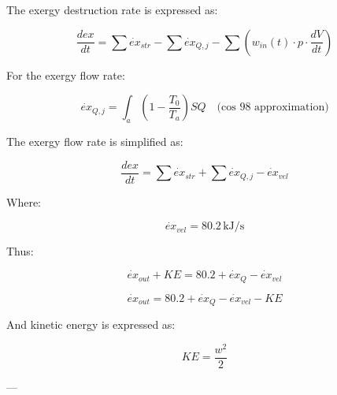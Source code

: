 The exergy destruction rate is expressed as:  

\[
\frac{d ex}{dt} = \sum \dot{ex}_{str} - \sum \dot{ex}_{Q,j} - \sum \left( w_{in}(t) \cdot p \cdot \frac{dV}{dt} \right)
\]

For the exergy flow rate:  

\[
\dot{ex}_{Q,j} = \int_a \left( 1 - \frac{T_0}{T_a} \right) SQ \quad \text{(cos 98 approximation)}
\]

The exergy flow rate is simplified as:  

\[
\frac{d ex}{dt} = \sum \dot{ex}_{str} + \sum \dot{ex}_{Q,j} - \dot{ex}_{vel}
\]

Where:  

\[
\dot{ex}_{vel} = 80.2 \, \text{kJ/s}
\]

Thus:  

\[
\dot{ex}_{out} + KE = 80.2 + \dot{ex}_{Q} - \dot{ex}_{vel}
\]

\[
\dot{ex}_{out} = 80.2 + \dot{ex}_{Q} - \dot{ex}_{vel} - KE
\]

And kinetic energy is expressed as:  

\[
KE = \frac{w^2}{2}
\]

---